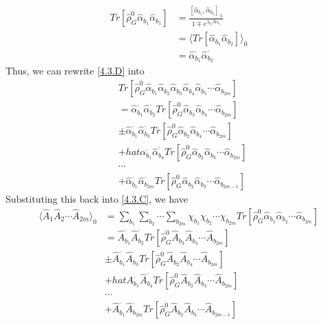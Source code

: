 \begin{equation}
\begin{aligned}
Tr[\hat{\rho}_G^0\hat\alpha_{b_1}\hat\alpha_{b_1}]&=\frac{[\hat\alpha_{b_1},\hat\alpha_{b_2}]_\mp}{1\mp e^{\lambda_{b_1}\beta e_{b_1}}}\\
&=\langle Tr[\hat\alpha_{b_1} \hat\alpha_{b_2}]\rangle_0\\
&=\hat\alpha_{b_1}^{\cdot}\hat\alpha_{b_2}^{\cdot}
\end{aligned}
\end{equation}
Thus, we can rewrite \ref{4.3.D} into
\begin{equation}
\begin{aligned}
&Tr[\hat{\rho}_G^0\hat \alpha_{b_1} \hat \alpha_{b_2} \hat \alpha_{b_3} \hat \alpha_{b_4} \hat \alpha_{b_5} \cdots \hat \alpha_{b_{2m}}]\\
&=\hat \alpha_{b_1}^\cdot \hat \alpha_{b_2}^\cdot Tr[\hat{\rho}_G^0 \hat \alpha_{b_3}\hat \alpha_{b_4}\cdots \hat \alpha_{b_{2m}}]\\
&\pm \hat \alpha_{b_1}^\cdot \hat \alpha_{b_3}^\cdot Tr[\hat{\rho}_G^0 \hat \alpha_{b_2}\hat \alpha_{b_4}\cdots \hat \alpha_{b_{2m}}]\\
&+hat \alpha_{b_1}^\cdot \hat \alpha_{b_4}^\cdot Tr[\hat{\rho}_G^0 \hat \alpha_{b_2}\hat \alpha_{b_3}\cdots \hat \alpha_{b_{2m}}]\\
&\cdots\\
&+\hat \alpha_{b_1}^\cdot \hat \alpha_{b_{2m}}^{\cdot} Tr[\hat{\rho}_G^0 \hat \alpha_{b_2}\hat \alpha_{b_3}\cdots \hat \alpha_{b_{2m-1}}]
\end{aligned}
\end{equation}
Substituting this back into \ref{4.3.C}, we have
\begin{equation}
\begin{aligned}
\langle\hat A_1 \hat A_2 \cdots \hat A_{2m}\rangle_0&=\sum_{b_1}\sum_{b_2}\cdots\sum_{b_{2m}} \chi_{b_1}\chi_{b_2}\cdots\chi_{b_{2m}}Tr[\hat{\rho}_G^0\hat{\alpha}_{b_1} \hat{\alpha}_{b_2} \cdots \hat{\alpha}_{b_{2m}}]\\
&=\hat A_{b_1}^\cdot \hat A_{b_2}^\cdot Tr[\hat{\rho}_G^0 \hat A_{b_3}\hat A_{b_4}\cdots \hat A_{b_{2m}}]\\
&\pm \hat A_{b_1}^\cdot \hat A_{b_3}^\cdot Tr[\hat{\rho}_G^0 \hat A_{b_2}\hat A_{b_4}\cdots \hat A_{b_{2m}}]\\
&+hat A_{b_1}^\cdot \hat A_{b_4}^\cdot Tr[\hat{\rho}_G^0 \hat A_{b_2}\hat A_{b_3}\cdots \hat A_{b_{2m}}]\\
&\cdots\\
&+\hat A_{b_1}^\cdot \hat A_{b_{2m}}^{\cdot} Tr[\hat{\rho}_G^0 \hat A_{b_2}\hat A_{b_3}\cdots \hat A_{b_{2m-1}}]
\end{aligned}
\end{equation}
